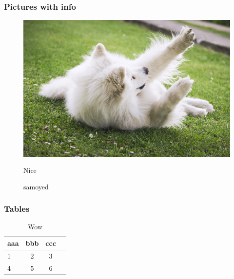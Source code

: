 \documentclass{beamer}
\begin{document}
\begin{frame}
\frametitle{Pictures with info}
\begin{figure}
\includegraphics[scale=0.5]{samoyed.jpg}
\caption{samoyed}
Nice
\end{figure}
\end{frame}

\begin{frame}
\frametitle{Tables}
\begin{table}
\begin{tabular}{l |c|c|c|}
aaa & bbb & ccc \\
\hline \hline
1 & 2 & 3 \\
4 & 5 & 6
\end{tabular}
\caption{Wow}
\end{table}
\end{frame}
\end{document}
